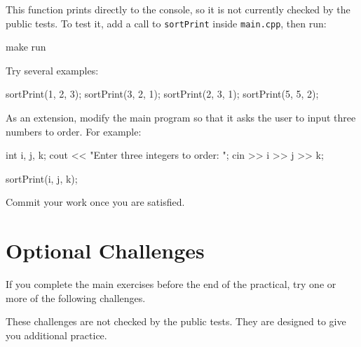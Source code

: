 \documentclass{csc2059practical}
\begin{document}
This function prints directly to the console, so it is not currently checked by the public tests. To test it, add a call to \texttt{sortPrint} inside \texttt{main.cpp}, then run:

\begin{bashcode}
make run
\end{bashcode}

Try several examples:

\begin{cppcode}
sortPrint(1, 2, 3);
sortPrint(3, 2, 1);
sortPrint(2, 3, 1);
sortPrint(5, 5, 2);
\end{cppcode}

As an extension, modify the main program so that it asks the user to input three numbers to order. For example:

\begin{cppcode}
int i, j, k;
cout << "Enter three integers to order: ";
cin >> i >> j >> k;

sortPrint(i, j, k);
\end{cppcode}

Commit your work once you are satisfied.

\section{Optional Challenges}

If you complete the main exercises before the end of the practical, try one or more of the following challenges.

\begin{importantnote}
These challenges are not checked by the public tests. They are designed to give you additional practice.
\end{importantnote}
\end{document}
